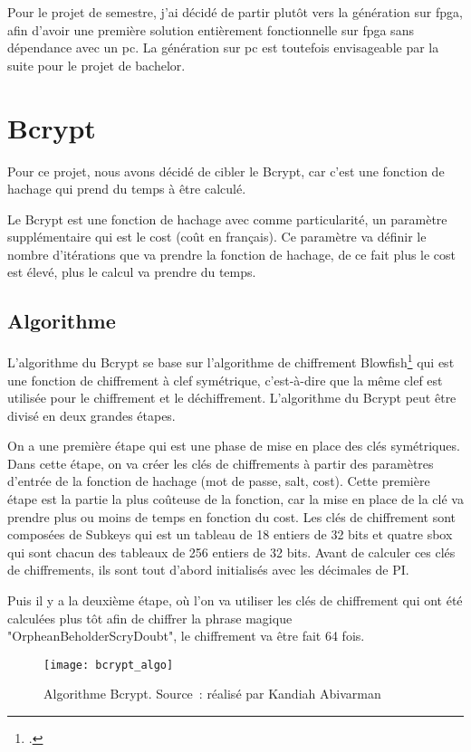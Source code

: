Pour le projet de semestre, j'ai décidé de partir plutôt vers la génération sur \gls{fpga}, afin d'avoir une première solution entièrement fonctionnelle sur \gls{fpga} sans dépendance avec un \gls{pc}. La génération sur \gls{pc} est toutefois envisageable par la suite pour le projet de bachelor.

\section{Bcrypt}

Pour ce projet, nous avons décidé de cibler le Bcrypt, car c'est une fonction de hachage qui prend du temps à être calculé. 

Le Bcrypt est une fonction de hachage avec comme particularité, un paramètre supplémentaire qui est le cost (coût en français).
Ce paramètre va définir le nombre d'itérations que va prendre la fonction de hachage, de ce fait plus le cost est élevé, plus le calcul va prendre du temps.

\subsection{Algorithme}

L'algorithme du Bcrypt se base sur l'algorithme de chiffrement Blowfish\footcite{noauthor_blowfish_2019} qui est une fonction de chiffrement à clef symétrique, c'est-à-dire que la même clef est utilisée pour le chiffrement et le déchiffrement. 
L'algorithme du Bcrypt peut être divisé en deux grandes étapes.

On a une première étape qui est une phase de mise en place des clés symétriques. 
Dans cette étape, on va créer les clés de chiffrements à partir des paramètres d'entrée de la fonction de hachage (mot de passe, salt, cost). 
Cette première étape est la partie la plus coûteuse de la fonction, car la mise en place de la clé va prendre plus ou moins de temps en fonction du cost. 
Les clés de chiffrement sont composées de Subkeys qui est un tableau de 18 entiers de 32 bits et quatre \gls{sbox} qui sont chacun des tableaux de 256 entiers de 32 bits. 
Avant de calculer ces clés de chiffrements, ils sont tout d'abord initialisés avec les décimales de PI.

Puis il y a la deuxième étape, où l'on va utiliser les clés de chiffrement qui ont été calculées plus tôt afin de chiffrer la phrase magique "OrpheanBeholderScryDoubt", le chiffrement va être fait 64 fois.

\begin{figure}[tbph!]
	\centering
	\texttt{[image: bcrypt\_algo]}
	\caption[Algorithme Bcrypt]{Algorithme Bcrypt. Source : réalisé par Kandiah Abivarman}
	\label{fig:bcrypt_algo}
\end{figure}

